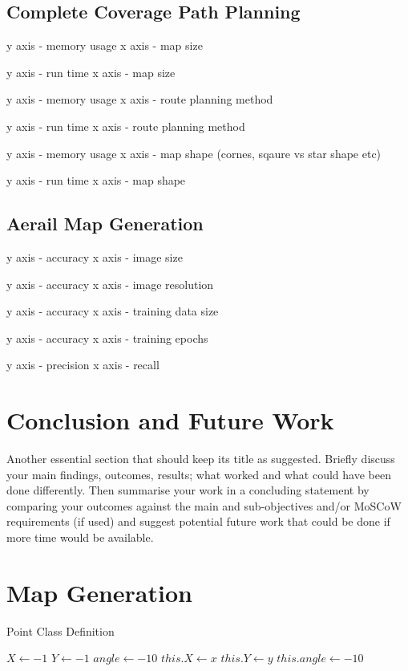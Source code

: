 \documentclass[final]{cmpreport_02}
\begin{document}
\subsection{Complete Coverage Path Planning}

y axis - memory usage
x axis - map size

y axis - run time
x axis - map size

y axis - memory usage
x axis - route planning method

y axis - run time
x axis - route planning method

y axis - memory usage
x axis - map shape (cornes, sqaure vs star shape etc)

y axis - run time
x axis - map shape

\subsection{Aerail Map Generation}

y axis - accuracy
x axis - image size

y axis - accuracy
x axis - image resolution

y axis - accuracy
x axis - training data size

y axis - accuracy
x axis - training epochs

y axis - precision
x axis - recall
\section{Conclusion and Future Work}


Another essential section that should keep its title as suggested. Briefly discuss your main findings, outcomes, results; what worked and what could have been done differently. Then summarise your work in a concluding statement by comparing your outcomes against the main and sub-objectives and/or MoSCoW requirements (if used) and suggest potential future work that could be done if more time would be available.


\clearpage



\appendix
\clearpage

\section{Map Generation}

\begin{algorithm}[h!]
	\caption{Point Class Definition}
	\label{mg:point class}
	\begin{algorithmic}[1]
		\State $X \gets -1$ 
		\State $Y \gets -1$ 
		\State $angle \gets -10$ 
		\State $this.X \gets x$
		\State $this.Y \gets y$
		\State $this.angle \gets -10$ 
		\EndProcedure
		\EndProcedure
	\end{algorithmic}
\end{algorithm}
\end{document}
